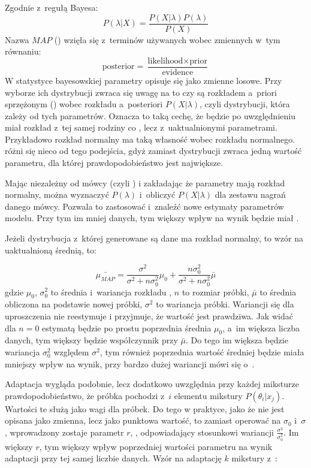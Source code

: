 Zgodnie z~regułą Bayesa:
$$P(\lambda | X) = \frac{P(X | \lambda) P(\lambda)}{P(X)}$$
Nazwa $MAP$ () wzięła się z~terminów używanych wobec zmiennych w~tym równaniu:
$$\text{posterior} = \frac{\text{likelihood} \times \text{prior}}{\text{evidence}}$$
W statystyce bayesowskiej parametry opisuje się jako zmienne losowe. Przy wyborze ich dystrybucji zwraca się uwagę
na to czy są rozkładem a~priori sprzężonym () wobec rozkładu a~posteriori $P(X | \lambda)$,
czyli dystrybucji, która zależy od tych parametrów.
Oznacza to taką cechę, że  będzie po uwzględnieniu  miał rozkład z~tej samej
rodziny co , lecz z~uaktualnionymi parametrami. Przykładowo rozkład normalny ma taką własność wobec
rozkładu normalnego.   różni się nieco od tego podejścia, gdyż zamiast dystrybucji zwraca jedną
wartość parametru, dla której prawdopodobieństwo jest największe.

Mając  niezależny od mówcy (czyli )
i zakładając że parametry mają rozkład normalny, można wyznaczyć
$P(\lambda)$ i~obliczyć $P(X | \lambda)$ dla zestawu nagrań danego mówcy. Pozwala to zastosować
 i~znaleźć nowe
estymaty parametrów modelu. Przy tym im mniej danych, tym większy wpływ na wynik będzie miał .

Jeżeli dystrybucja z~której generowane są dane ma rozkład normalny, to wzór na uaktualnioną średnią, to:

$$\bar{\mu_{MAP}} = \frac{\sigma^2}{\sigma^2 + n \sigma_0^2} \mu_0 + \frac{n \sigma^2_0}{\sigma^2 + n \sigma_0^2} \bar{\mu}$$
gdzie $\mu_0$, $\sigma_0^2$ to średnia i~wariancja rozkładu , $n$ to rozmiar próbki, $\bar{\mu}$ to średnia obliczona na podstawie nowej próbki, $\sigma^2$ to wariancja próbki. Wariancji się dla uproszczenia nie reestymuje
i przyjmuje, że wartość  jest prawdziwa. Jak widać
dla $n = 0$  estymatą będzie po prostu poprzednia średnia $\mu_0$, a~im większa liczba danych, tym
większy będzie współczynnik przy $\bar{\mu}$. Do tego im większa będzie wariancja  $\sigma_0^2$ względem
$\sigma^2$, tym również poprzednia wartość średniej będzie miała mniejszy wpływ na wynik, przy bardzo dużej wariancji
mówi się o~\cite{fundamentalsOfSpeech}.

Adaptacja  wygląda podobnie, lecz dodatkowo uwzględnia przy każdej miksturze prawdopodobieństwo,
że próbka pochodzi z~$i$ elementu mikstury $P(\theta_i | x_j)$. Wartości te służą jako wagi dla próbek. Do tego w
praktyce, jako że  nie jest opisana jako zmienna, lecz jako punktowa wartość, to zamiast
operować na $\sigma_0$ i~$\sigma$, wprowadzony zostaje parametr $r$, , odpowiadający
stosunkowi wariancji $\frac{\sigma^2}{\sigma_0^2}$. Im większy $r$, tym większy wpływ poprzedniej wartości
parametru na wynik adaptacji przy tej samej liczbie danych. Wzór na adaptację $k$ mikstury z~\cite{comparisonOfMultiple}:


